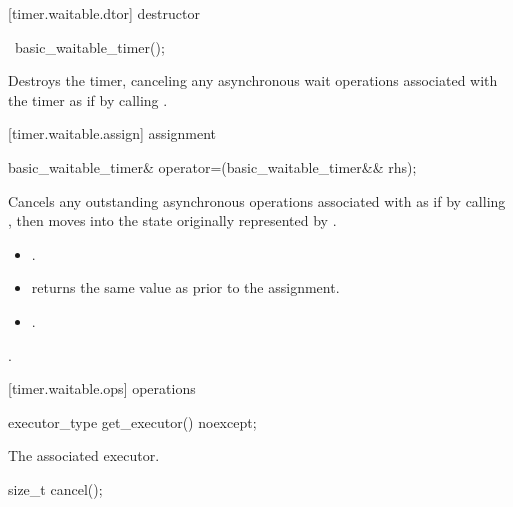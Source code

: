 [timer.waitable.dtor]{ destructor}

%
\begin{itemdecl}
~basic_waitable_timer();
\end{itemdecl}

\begin{itemdescr}
\pnum
\effects Destroys the timer, canceling any asynchronous wait operations associated with the timer as if by calling .
\end{itemdescr}



[timer.waitable.assign]{ assignment}

%
\begin{itemdecl}
basic_waitable_timer& operator=(basic_waitable_timer&& rhs);
\end{itemdecl}

\begin{itemdescr}
\pnum
\effects Cancels any outstanding asynchronous operations associated with  as if by calling , then moves into  the state originally represented by .

\pnum
\postconditions
\begin{itemize}
\item
{}.
\item
{} returns the same value as  prior to the assignment.
\item
{}.
\end{itemize}

\pnum
\returns {}.
\end{itemdescr}



[timer.waitable.ops]{ operations}

%
\begin{itemdecl}
executor_type get_executor() noexcept;
\end{itemdecl}

\begin{itemdescr}
\pnum
\returns The associated executor.
\end{itemdescr}

%
\begin{itemdecl}
size_t cancel();
\end{itemdecl}

